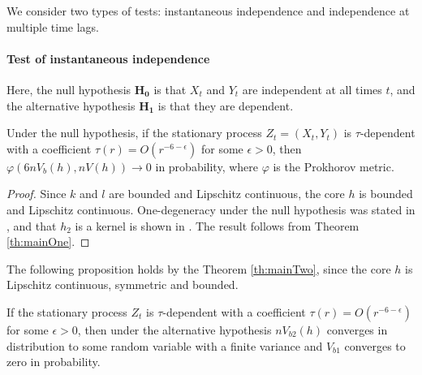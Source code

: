 We consider two types of tests: instantaneous independence and independence at multiple time lags.





\paragraph{Test of instantaneous independence}
Here, the null hypothesis  $\mathbf{H_0}$ is that  $X_t$ and $Y_t$ are independent at all times $t$,  and the alternative hypothesis $\mathbf{H_1}$ is that they are dependent. 

\begin{proposition}
\label{prop:null}
Under the null hypothesis, if the stationary process $Z_t=\left(X_t,Y_t\right)$ is $\tau$-dependent with a coefficient $\tau(r) = O\left(r^{-6-\epsilon}\right)$ for some $\epsilon>0$, then $\varphi(6 n V_b(h),n V(h))\to 0$ in probability, where $\varphi$ is the Prokhorov metric. 
\end{proposition}
\begin{proof}
Since $k$ and $l$ are bounded and Lipschitz continuous, the core $h$ is bounded  and Lipschitz continuous. One-degeneracy under the null hypothesis was stated in \cite[Theorem 2]{gretton_kernel_2008}, and that $h_2$ is a kernel is shown in \cite[section A.2, following eq. (11)]{gretton_kernel_2008}. The result follows from Theorem \ref{th:mainOne}.
\end{proof}

The following proposition holds by the Theorem \ref{th:mainTwo}, since the core $h$ is  Lipschitz continuous, symmetric and bounded.
\begin{proposition}
\label{prop:alternative}
If the stationary process $Z_t$ is $\tau$-dependent with a coefficient $\tau(r) = O\left(r^{-6-\epsilon}\right)$ for some $\epsilon>0$, then under the alternative hypothesis $n V_{b2}(h)$ converges in distribution to some random variable with a finite variance and $ V_{b1}$ converges to zero in probability. 
\end{proposition}


